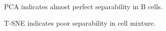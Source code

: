 \documentclass[3p,authoryear,preprint,12pt]{elsarticle}
\makeatletter
\def\fixFloatSize#1{}%
\makeatother
\begin{document}
\egroup
\bgroup
\fixFloatSize{img/BPCA.png}
\begin{figure}[!htbp]
	\centering \makeatletter{}
	\makeatother 
	\caption{{PCA indicates almost perfect separability in B cells.}}
	\label{f-c2b15a1bacg9}
\end{figure}
\egroup
\bgroup
\fixFloatSize{img/mixtSNE.png}
\begin{figure}[!htbp]
	\centering \makeatletter{}
	\makeatother 
	\caption{{T-SNE indicates poor separability in cell mixture.}}
	\label{f-c2b15a1bach9}
\end{figure}
\end{document}

